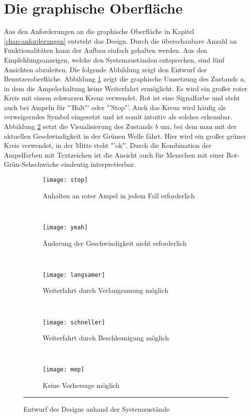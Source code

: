 \section{Die graphische Oberfläche}
Aus den Anforderungen an die graphische Oberfläche in Kapitel \ref{chap:anforderungen} entsteht das Design. Durch die überschaubare Anzahl an Funktionalitäten kann der Aufbau einfach gehalten werden. Aus den Empfehlungsanzeigen, welche den Systemzuständen entsprechen, sind fünf Ansichten abzuleiten. Die folgende Abbildung zeigt den Entwurf der Benutzeroberfläche.
Abbildung \ref{fig:stop} zeigt die graphische Umsetzung des Zustands \textit{a}, in dem die Ampelschaltung keine Weiterfahrt ermöglicht. Es wird ein großer roter Kreis mit einem schwarzen Kreuz verwendet. Rot ist eine Signalfarbe und steht auch bei Ampeln für "'Halt"' oder "'Stop"'. Auch das Kreuz wird häufig als verweigerndes Symbol eingesetzt und ist somit intuitiv als solches erkennbar.\\
Abbildung \ref{fig:yeah} setzt die Visualisierung des Zustands \textit{b} um, bei dem man mit der aktuellen Geschwindigkeit in der Grünen Welle fährt. Hier wird ein großer grüner Kreis verwendet, in der Mitte steht "'ok"'. Durch die Kombination der Ampelfarben mit Textzeichen ist die Ansicht auch für Menschen mit einer Rot-Grün-Sehschwäche eindeutig interpretierbar.
\begin{figure}[H]
        \centering
           \begin{subfigure}[t]{0.18\textwidth}
                \texttt{[image: stop]}
                \caption[Systemzustand a]{Anhalten an roter Ampel in jedem Fall erforderlich}
                \label{fig:stop}
        \end{subfigure}
           ~ 
              \begin{subfigure}[t]{0.18\textwidth}
                \texttt{[image: yeah]}
                \caption[Systemzustand b]{Änderung der Geschwindigkeit nicht erforderlich}
                \label{fig:yeah}
        \end{subfigure}
           ~
        \begin{subfigure}[t]{0.18\textwidth}
                \texttt{[image: langsamer]}
                \caption[Systemzustand c]{Weiterfahrt durch Verlangsamung möglich}
                \label{fig:langsamer}
        \end{subfigure}
        ~
        \begin{subfigure}[t]{0.18\textwidth}
                \texttt{[image: schneller]}
                \caption[Systemzustand d]{Weiterfahrt durch Beschleunigung möglich}
                \label{fig:schneller}
        \end{subfigure} 
        ~ 
        \begin{subfigure}[t]{0.18\textwidth}
        	\texttt{[image: mep]}
        	\caption[Systemzustand e]{Keine Vorhersage möglich}
            \label{fig:meh}
        \end{subfigure} 
        \rule{35em}{0.5pt}   
        \caption[Systemzustände im Ampelbereich]{Entwurf des Designs anhand der Systemzustände}
        \label{fig:mockup}
\end{figure}
